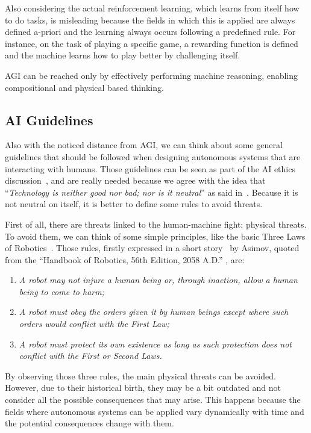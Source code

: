 Also considering the actual reinforcement learning, which learns from itself how to do tasks, is misleading because the fields in which this is applied are always defined a-priori and the learning always occurs following a predefined rule. For instance, on the task of playing a specific game, a rewarding function is defined and the machine learns how to play better by challenging itself.

AGI can be reached only by effectively performing machine reasoning, enabling compositional and physical based thinking.

\subsection{AI Guidelines}
\label{aiGuidelines}

Also with the noticed distance from AGI, we can think about some general guidelines that should be followed when designing autonomous systems that are interacting with humans. Those guidelines can be seen as part of the AI ethics discussion~\cite{hibbard2014ethical,moor2009four}, and are really needed because we agree with the idea that ``\textit{Technology is neither good nor bad; nor is it neutral}''  as said in~\cite{kranzberg1986technology}. Because it is not neutral on itself, it is better to define some rules to avoid threats.

First of all, there are threats linked to the human-machine fight: physical threats. To avoid them, we can think of some simple principles, like the basic Three Laws of Robotics~\cite{clarke2011asimov}. Those rules, firstly expressed in a short story~\cite{asimov1942runaround} by Asimov, quoted from  the ``Handbook of Robotics, 56th Edition, 2058 A.D.'' , are:

\begin{enumerate}
	\item \textit{A robot may not injure a human being or, through inaction, allow a human being to come to harm;}
	\item \textit{A robot must obey the orders given it by human beings except where such orders would conflict with the First Law;}
	\item \textit{A robot must protect its own existence as long as such protection does not conflict with the First or Second Laws.}
\end{enumerate}
By observing those three rules, the main physical threats can be avoided. However, due to their historical birth, they may be a bit outdated and not consider all the possible consequences that may arise. This happens because the fields where autonomous systems can be applied vary dynamically with time and the potential consequences change with them.

